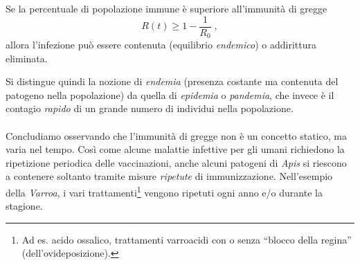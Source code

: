 Se la percentuale di popolazione immune è superiore all'immunità di gregge
$$R(t) \geq 1 - \frac{1}{R_0} \; ,$$
allora l'infezione può essere contenuta (equilibrio \emph{endemico}) o addirittura eliminata.

Si distingue quindi la nozione di \emph{endemia} (presenza costante ma contenuta del patogeno nella popolazione)
da quella di \emph{epidemia} o \emph{pandemia}, che invece è il contagio \emph{rapido} di un grande numero di individui
nella popolazione.

\paragraph{}
Concludiamo osservando che l'immunità di gregge non è un concetto statico, ma varia nel tempo.
Così come alcune malattie infettive per gli umani richiedono la ripetizione periodica delle vaccinazioni,
anche alcuni patogeni di \emph{Apis} si riescono a contenere soltanto tramite misure \emph{ripetute} di
immunizzazione. Nell'esempio della \emph{Varroa}, i vari trattamenti\footnote{Ad es. acido ossalico, trattamenti varroacidi
    con o senza ``blocco della regina'' (\ie dell'ovideposizione).}
vengono ripetuti ogni anno e/o durante la stagione.










